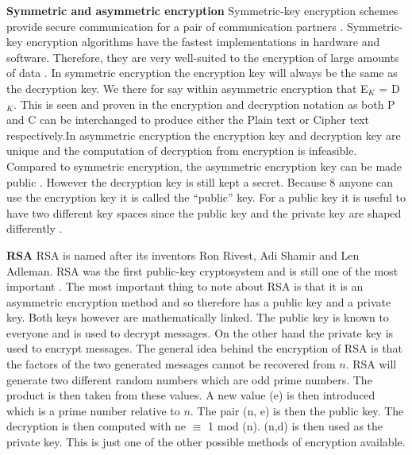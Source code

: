 \documentclass[11pt,a4paper]{report}
\begin{document}
\textbf{Symmetric and asymmetric encryption}\newline
Symmetric-key encryption schemes provide secure communication for a pair of communication partners \cite{DBLP:series/isc/DelfsK07}. Symmetric-key encryption algorithms have the fastest implementations in hardware and software. Therefore, they are very well-suited to the encryption of large amounts of data \cite{DBLP:series/isc/DelfsK07}. In symmetric encryption the encryption key will always be the same as the decryption key. We there for say within asymmetric encryption that E$_{K}$ = D$_{K}$. This is seen and proven in the encryption and decryption notation as both P and C can be interchanged to produce either the Plain text or Cipher text respectively.In asymmetric encryption the encryption key and decryption key are unique and the computation of decryption from encryption is infeasible. Compared to symmetric encryption, the asymmetric encryption key can be made public \cite{DBLP:series/isc/DelfsK07}. However the decryption key is still kept a secret. Because
8
anyone can use the encryption key it is called the “public” key. For a public key it is useful to have two different key spaces since the public key and the private key are shaped differently \cite{DBLP:series/isc/DelfsK07}.\newline

\textbf{RSA}\newline
RSA is named after its inventors Ron Rivest, Adi Shamir and Len Adleman. RSA was the first public-key cryptosystem and is still one of the most important \cite{DBLP:series/isc/DelfsK07}. The most important thing to note about RSA is that it is an asymmetric encryption method and so therefore has a public key and a private key. Both keys however are mathematically linked. The public key is known to everyone and is used to decrypt messages. On the other hand the private key is used to encrypt messages. The general idea behind the encryption of RSA is that the factors of the two generated messages cannot be recovered from $n$. RSA will generate two different random numbers which are odd prime numbers. The product is then taken from these values. A new value (e) is then introduced which is a prime number relative to $n$. The pair (n, e) is then the public key. The decryption is then computed with ne $\equiv$ 1 mod (n). (n,d) is then used as the private key. This is just one of the other possible methods of encryption available.
\end{document}
